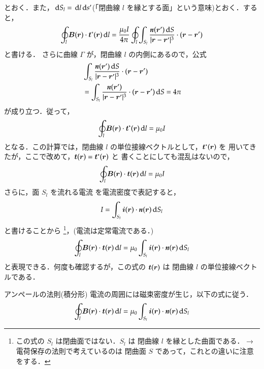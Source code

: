             とおく．また，$\,\mathrm{d} S_{l}=\,\mathrm{d} l\,\mathrm{d} s'$(「閉曲線 $l$ を縁とする面」という意味)とおく．すると，
            \begin{align}
            \oint_{l}\boldsymbol{B}(\boldsymbol{r})\cdot \boldsymbol{t}^{\ast}(\boldsymbol{r})\,\mathrm{d} l
            =\frac{\mu_{0}I}{4\pi}\oint_{l}
             \int_{S_{l}}\frac{\textit{\textbf{n}}(\boldsymbol{r}')\,\mathrm{d} S
            }{|\boldsymbol{r}-\boldsymbol{r}'|^{3}}\cdot
            (\boldsymbol{r}-\boldsymbol{r}')
            \end{align}
            と書ける．
            さらに曲線 $\Gamma$ が，閉曲線 $l$ の内側にあるので，公式
            \begin{align*}
            &\int_{S_{l}}\frac{\textit{\textbf{n}}(\boldsymbol{r}')\,\mathrm{d} S
            }{|\boldsymbol{r}-\boldsymbol{r}'|^{3}}\cdot
            (\boldsymbol{r}-\boldsymbol{r}') \\
            &=\int_{S_{l}}\frac{\textit{\textbf{n}}(\boldsymbol{r}')
            }{|\boldsymbol{r}-\boldsymbol{r}'|^{3}}\cdot
            (\boldsymbol{r}-\boldsymbol{r}')\,\mathrm{d} S=4\pi
            \end{align*}
            が成り立つ．従って，
            \begin{align}
            \oint_{l}\boldsymbol{B}(\boldsymbol{r})\cdot \boldsymbol{t}^{\ast}(\boldsymbol{r})\,\mathrm{d} l
            =\mu_{0}I
            \end{align}
            となる．この計算では，閉曲線 $l$ の単位接線ベクトルとして，$\boldsymbol{t}^{\ast}(\boldsymbol{r})$ を
            用いてきたが，ここで改めて，$\boldsymbol{t}(\boldsymbol{r})=\boldsymbol{t}^{\ast}(\boldsymbol{r})$ と
            書くことにしても混乱はないので，
            \begin{align}
            \oint_{l}\boldsymbol{B}(\boldsymbol{r})\cdot \boldsymbol{t}(\boldsymbol{r})\,\mathrm{d} l
            =\mu_{0}I
            \end{align}
            さらに，面 $S_{l}$ を流れる電流 を電流密度で表記すると，
            \begin{align}
            I=\int_{S_{l}} \boldsymbol{i}(\boldsymbol{r})\cdot\textit{\textbf{n}}(\boldsymbol{r})\,\mathrm{d} S_{l}
            \end{align}
            と書けることから
            \footnote{
            この式の $S_{l}$ は閉曲面ではない．$S_{l}$ は
            閉曲線 $l$ を縁とした曲面である． → 電荷保存の法則で考えているのは
            閉曲面 $S$ であって，これとの違いに注意をする．
            }，(電流は定常電流である．)
            \begin{align}
            \oint_{l}\boldsymbol{B}(\boldsymbol{r})\cdot \boldsymbol{t}(\boldsymbol{r})\,\mathrm{d} l
            =\mu_{0}\int_{S_{l}} \boldsymbol{i}(\boldsymbol{r})\cdot\textit{\textbf{n}}(\boldsymbol{r})\,\mathrm{d} S_{l}
            \end{align}
            と表現できる．何度も確認するが，この式の $\boldsymbol{t}(\boldsymbol{r})$ は
            閉曲線 $l$ の単位接線ベクトルである．
                \begin{myshadebox}{アンペールの法則(積分形)}
                    電流の周囲には磁束密度が生じ，以下の式に従う．
                    \begin{align}
                        \oint_{l} \boldsymbol{B}(\boldsymbol{r})\cdot\boldsymbol{t}(\boldsymbol{r})\,\mathrm{d} l
                        =\mu_{0}\int_{S_{l}} \boldsymbol{i}(\boldsymbol{r})
                        \cdot\textit{\textbf{n}}(\boldsymbol{r})\,\mathrm{d} S_{l}
                    \end{align}
                \end{myshadebox}

